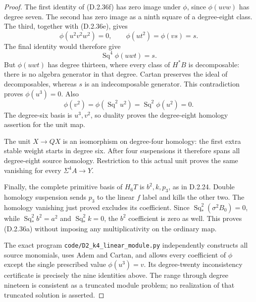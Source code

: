 \begin{proof}
The first identity of \textup{(D.2.36f)} has zero image under
$\phi$, since $\phi(uvw)$ has degree seven. The second has
zero image as a ninth square of a degree-eight class.
The third, together with \textup{(D.2.36e)}, gives
\[
 \phi(u^2v^2w^2)=0,\qquad
 \phi(ut^2)=\phi(vs)=s.
                       \tag{D.2.36h}
\]
The final identity would therefore give
\[
                       \operatorname{Sq}^4\phi(uwt)=s.
                       \tag{D.2.36i}
\]
But $\phi(uwt)$ has degree thirteen, where every class of
$H^*B$ is decomposable: there is no algebra generator in
that degree. Cartan preserves the ideal of decomposables,
whereas $s$ is an indecomposable generator. This contradiction
proves $\phi(u^3)=0$. Also
\[
 \phi(v^2)=\phi(\operatorname{Sq}^2u^2)
          =\operatorname{Sq}^2\phi(u^2)=0.
\]
The degree-six basis is $u^3,v^2$, so duality proves the
degree-eight homology assertion for the unit map.

The unit $X\to QX$ is an isomorphism on degree-four
homology: the first extra stable weight starts in degree six.
After four suspensions it therefore spans all degree-eight
source homology. Restriction to this actual unit proves the
same vanishing for every $\Sigma^4A\to Y$.

Finally, the complete primitive basis of $H_6T$ is
$b^2,k,p_3$, as in D.2.24. Double homology suspension sends
$p_3$ to the linear $f$ label and kills the other two.
The homology vanishing just proved excludes its coefficient.
Since $\operatorname{Sq}_*^2(\sigma^2B_0)=0$, while
$\operatorname{Sq}_*^2b^2=a^2$ and
$\operatorname{Sq}_*^2k=0$, the $b^2$ coefficient is zero
as well. This proves \textup{(D.2.36a)} without imposing
any multiplicativity on the ordinary map.

The exact program \texttt{code/D2\_k4\_linear\_module.py}
independently constructs all source monomials, uses Adem and
Cartan, and allows every coefficient of $\phi$ except the
single prescribed value $\phi(u^3)=v$. Its degree-twenty
inconsistency certificate is precisely the nine identities
above. The range through degree nineteen is consistent as
a truncated module problem; no realization of that truncated
solution is asserted.
\end{proof}
